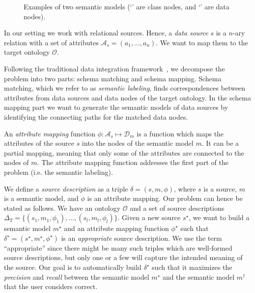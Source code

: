 \documentclass[letterpaper]{article} %
\newcommand{\authornote}[3]{
  {\fbox{\sc 
  #1}:$\blacktriangleright$\textcolor{#2}{\small{#3}}$\blacktriangleleft$}%
}
\newcommand{\npr}[1]{\authornote{NPR}{orange}{#1}}
\begin{document}
\begin{figure}[ht]
\caption{Examples of two semantic models (`\protect{}' are class nodes, and `\protect{}' are data 
nodes).}
\label{FIG:sem}
\vspace{-3mm}
\end{figure}

In our setting we work with relational sources.
Hence, a \emph{data source} $s$ is a $n$-ary relation with a set of attributes 
$\mathcal{A}_s = (a_1,...,a_n)$.
We want to map them to the target ontology $\mathcal{O}$.

Following the traditional data integration framework~\cite{doan2012principles}, we decompose the problem into two parts: schema matching and schema mapping.
Schema matching, which we refer to as \emph{semantic labeling}, finds 
correspondences between attributes from data sources and data nodes of the 
target ontology.
In the schema mapping part we want to generate the semantic models of data sources by identifying the connecting paths for the matched data nodes.

An \emph{attribute mapping} function $\phi : \mathcal{A}_s \mapsto 
\mathcal{D}_m$ is a function which maps the attributes of the source $s$ into the nodes of the semantic model $m$. 
It can be a partial mapping, meaning that only some of the attributes
are connected to the nodes of $m$.
The attribute mapping function addresses the first part of the problem (i.e. the semantic labeling).

We define a \emph{source description} as a triple $\delta = (s, m, \phi)$, where $s$ is a source, $m$ is a semantic model, and $\phi$ is an attribute mapping.
Our problem can hence be stated as follows. We have an ontology 
$\mathcal{O}$ and a set of source descriptions $\Delta_T = \{(s_1, m_1, \phi_1),..., 
(s_l, m_l, \phi_l)\}$.
Given a new source $s^\star$, we want to build a semantic model $m^\star$ and an attribute mapping function $\phi^\star$ such that 
$\delta^\star = (s^\star,m^\star,\phi^\star)$ is an \emph{appropriate} source description. 
We use the term ``appropriate'' since there might be many such triples which are well-formed source descriptions, 
but only one or a few will capture the intended meaning of the source. 
Our goal is to automatically build $\delta^\star$ such that it maximizes the \emph{precision} and \emph{recall} between the semantic model 
$m^\star$ and the semantic model $m^\dag$ that the user considers correct. 
\end{document}
